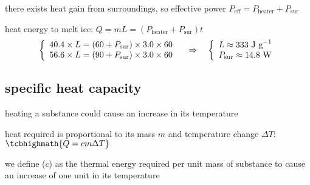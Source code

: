 \begin{soln} there exists heat gain from surroundings, so effective power $P_\text{eff}=P_\text{heater}+P_\text{sur}$

heat energy to melt ice: $Q = mL = (P_\text{heater}+P_\text{sur}) t$
\begin{equation*}
	\left\{ \begin{array}{l}
		40.4 \times L = (60+P_\text{sur})\times3.0\times60 \\
		56.6 \times L = (90+P_\text{sur})\times3.0\times60 
	\end{array}\right.
	\quad \Rightarrow \quad \left\{ \begin{array}{l}
	L \approx 333 \text{ J g}^{-1} \\
	P_\text{sur} \approx 14.8 \text{ W} \end{array}\right. 
\end{equation*}

\end{soln}


\subsection{specific heat capacity}

heating a substance could cause an increase in its temperature

heat required is proportional to its mass $m$ and temperature change $\Delta T$: $\tcbhighmath{Q=cm\Delta T}$

\begin{ilight}
	we define  ($c$) as the thermal energy required per unit mass of substance to cause an increase of one unit in its temperature
\end{ilight}


